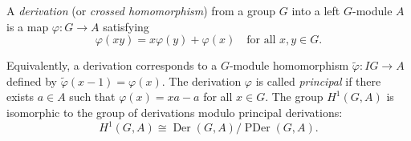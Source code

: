 A \emph{derivation} (or \emph{crossed homomorphism}) from a group $G$ into a left $G$-module $A$ is a map $\varphi: G \to A$ satisfying
$$\varphi(xy) = x \varphi(y) + \varphi(x) \quad \text{for all } x, y \in G.$$

Equivalently, a derivation corresponds to a $G$-module homomorphism $\tilde{\varphi}: IG \to A$ defined by $\tilde{\varphi}(x-1) = \varphi(x)$. The derivation $\varphi$ is called \emph{principal} if there exists $a \in A$ such that $\varphi(x) = xa - a$ for all $x \in G$. The group $H^1(G, A)$ is isomorphic to the group of derivations modulo principal derivations:
$$H^1(G, A) \cong \operatorname{Der}(G, A) / \operatorname{PDer}(G, A).$$
